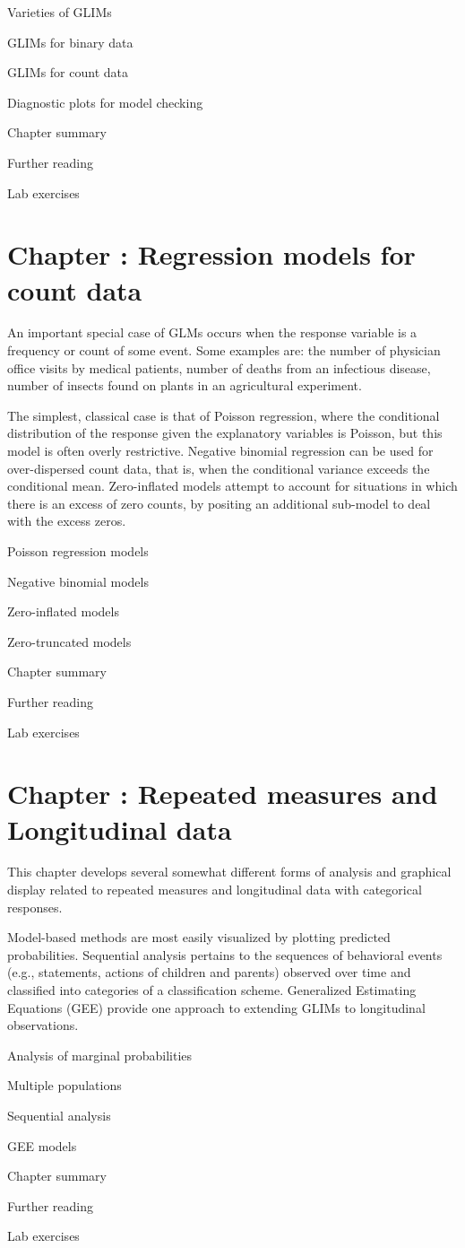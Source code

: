 \documentclass{article}
\newcommand{\Chapter}[1]{\section{Chapter \thesection: #1}}
\newcommand{\Section}[1]{\item #1}
\begin{document}
\begin{enumerate*}
	\item Varieties of GLIMs
	\item GLIMs for binary data
	\item GLIMs for count data
	\item Diagnostic plots for model checking
  \Section{Chapter summary}
  \Section{Further reading}
  \Section{Lab exercises}
\end{enumerate*}

\Chapter{Regression models for count data}\label{ch:count}

An important special case of GLMs occurs when the response variable is a frequency
or count of some event. Some examples are: the number of physician office visits by medical
patients, number of deaths from an infectious disease, number of insects found on plants
in an agricultural experiment.

The simplest, classical case is that of Poisson regression,
where the conditional distribution of the response given the explanatory variables
is Poisson, but this model is often overly restrictive.
Negative binomial regression can be used for over-dispersed count data,
that is, when the conditional variance exceeds the conditional mean.
Zero-inflated models attempt to account for situations in which there is an
excess of zero counts, by positing an additional sub-model to deal with the excess zeros.

\begin{enumerate*}
	\item Poisson regression models
	\item Negative binomial models
	\item Zero-inflated models
	\item Zero-truncated models
  \Section{Chapter summary}
  \Section{Further reading}
  \Section{Lab exercises}
\end{enumerate*}


\Chapter{Repeated measures and Longitudinal data}\label{ch:repmes}

This chapter develops several somewhat different forms of analysis and graphical display
related to repeated measures and longitudinal data with categorical responses.

Model-based methods are most easily
visualized by plotting predicted probabilities.
Sequential analysis pertains to the sequences of behavioral events
(e.g., statements, actions of children and parents)
observed over time and classified into categories of a classification
scheme.
Generalized Estimating Equations (GEE) provide one approach to
extending GLIMs to longitudinal observations.
\begin{enumerate*}
	\item Analysis of marginal probabilities
	\item Multiple populations
	\item Sequential analysis
	\item GEE models
  \Section{Chapter summary}
  \Section{Further reading}
  \Section{Lab exercises}
\end{enumerate*}
\end{document}
